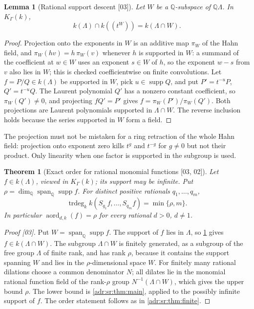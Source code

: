 \documentclass[11pt,letterpaper]{article}
\numberwithin{equation}{section}
\newtheorem{theorem}{Theorem}[section]
\newtheorem{lemma}[lemma]{Lemma}
\theoremstyle{definition}
\theoremstyle{remark}
\newcommand{\Q}{\mathbb Q}
\newcommand{\K}{K_\Gamma(k)}
\newcommand{\supp}{\operatorname{supp}}
\newcommand{\trdeg}{\operatorname{trdeg}}
\newcommand{\src}[1]{\textup{[#1]}}%
\begin{document}
\begin{lemma}[Rational support descent \src{03}]
\label{adr:sr:lem:descent}
Let $W$ be a $\Q$-subspace of $\Q\Lambda$. In $\K$,
\begin{equation}\label{adr:sr:eq:descent}
 k(\Lambda)\cap k((t^W))=k(\Lambda\cap W).
\end{equation}
\end{lemma}
\begin{proof}
Projection onto the exponents in $W$ is an additive map $\pi_W$ of the Hahn
field, and $\pi_W(hv)=h\,\pi_W(v)$ whenever $h$ is supported in $W$: a
summand of the coefficient at $w\in W$ uses an exponent $s\in W$ of $h$, so the
exponent $w-s$ from $v$ also lies in $W$; this is checked coefficientwise on
finite convolutions. Let $f=P/Q\in k(\Lambda)$ be supported in $W$, pick
$u\in\supp Q$, and put $P'=t^{-u}P$, $Q'=t^{-u}Q$. The Laurent polynomial $Q'$
has a nonzero constant coefficient, so $\pi_W(Q')\ne0$, and projecting
$fQ'=P'$ gives $f=\pi_W(P')/\pi_W(Q')$. Both projections are Laurent
polynomials supported in $\Lambda\cap W$. The reverse inclusion holds because
the series supported in $W$ form a field.
\end{proof}

The projection must not be mistaken for a ring retraction of the whole Hahn
field: projection onto exponent zero kills $t^g$ and $t^{-g}$ for $g\ne0$ but
not their product. Only linearity when one factor is supported in the
subgroup is used.

\begin{theorem}[Exact order for rational monomial functions \src{03, 02}]
\label{adr:sr:thm:rational}
Let $f\in k(\Lambda)$, viewed in $\K$; its support may be infinite. Put
$\rho=\dim_\Q\operatorname{span}_\Q\supp f$. For distinct positive rationals
$q_1,\ldots,q_m$,
\[
 \trdeg_kk(S_{q_1}f,\ldots,S_{q_m}f)=\min\{\rho,m\}.
\]
In particular $\operatorname{aord}_{d,k}(f)=\rho$ for every rational $d>0$,
$d\ne1$.
\end{theorem}
\begin{proof}[Proof \src{03}]
Put $W=\operatorname{span}_\Q\supp f$. The support of $f$ lies in $\Lambda$,
so \cref{adr:sr:lem:descent} gives $f\in k(\Lambda\cap W)$. The subgroup
$\Lambda\cap W$ is finitely generated, as a subgroup of the free group
$\Lambda$ of finite rank, and has rank $\rho$, because it contains the support
spanning $W$ and lies in the $\rho$-dimensional space $W$. For finitely many
rational dilations choose a common denominator $N$; all dilates lie in the
monomial rational function field of the rank-$\rho$ group
$N^{-1}(\Lambda\cap W)$, which gives the upper bound $\rho$. The lower bound is
\cref{adr:sr:thm:main}, applied to the possibly infinite support of $f$. The
order statement follows as in \cref{adr:sr:thm:finite}.
\end{proof}
\end{document}
